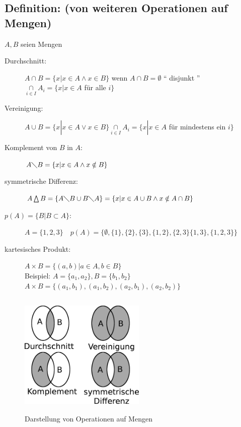 \subsection{Definition: (von weiteren Operationen auf Mengen)}

$A,B$ seien Mengen
\begin{description}
	\item[Durchschnitt: ] $A\cap B = \{x|x\in A \wedge x \in B\}$ wenn $A\cap B = 	
		\emptyset$ "` disjunkt "' $\mathop{\cap}\limits_{i\in I}A_{i}=\{x|x \in A$ für alle 
		$i\}$
	\item [Vereinigung: ]$A\cup B = \{x|x\in A \vee x \in B\}\mathop{\cap}\limits_{i\in 
		I}A_{i}=\{x|x \in A$ für mindestens ein $i\}$
	\item[Komplement von $B$ in $A$:] $A\diagdown B = \{x|x \in A \wedge x \notin 
		B\}$
	\item[symmetrische Differenz: ] $A \bigtriangleup B = \{A \diagdown B \cup B 
		\diagdown  A\} = \{x|x\in A \cup B \wedge x \notin A\cap B\}$
	\item[$p(A) = \{ B|B\subset A\}$: ] $A = \{1,2,3\} \quad p(A) = \{\emptyset , \{1\},
		\{2\},\{3\},\{1,2\},\{2,3\}\{1,3\},\{1,2,3\}\}$
	\item[kartesisches Produkt: ] $ A\times B = \{(a,b)|a\in A, b\in B\}$\\
		Beispiel: $A=\{a_{1},a_{2}\}, B=\{b_{1}, b_{2}\}$\\
		$A \times B = \{(a_{1},b_{1}),(a_{1},b_{2}),(a_{2},b_{1}),(a_{2},b_{2})\}$
\end{description}

\begin{figure} [H]
\centering 
\includegraphics[width=6cm, height=6cm]{mainmatter/chapter0/pics/durchschnitt.png}
\caption{Darstellung von Operationen auf Mengen} 
\end{figure}
%
%
%
